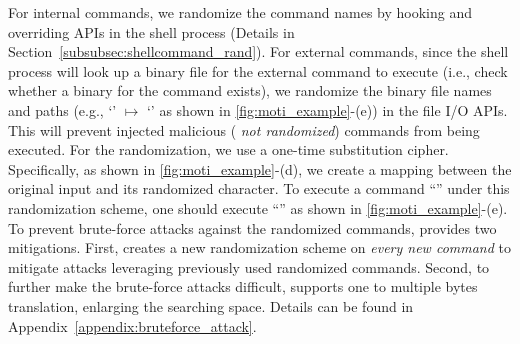 For internal commands, we randomize the command names by hooking and overriding APIs in the shell process (Details in Section~\ref{subsubsec:shellcommand_rand}).
For external commands, since the shell process will look up a binary file for the external command to execute (i.e., check whether a binary for the command exists), we randomize the binary file names and paths (e.g., `' $\mapsto$ `' as shown in \autoref{fig:moti_example}-(e)) in the file I/O APIs. 
This will prevent injected malicious ( {\it not randomized}) commands from being executed. 
%
For the randomization, we use a one-time substitution cipher. %
Specifically, as shown in \autoref{fig:moti_example}-(d), we create a mapping between the original input and its randomized character. %
%
To execute a command ``'' under this randomization scheme, one should execute ``'' as shown in  \autoref{fig:moti_example}-(e). 
To prevent brute-force attacks against the randomized commands, \sysname provides two mitigations. 
First, \sysname creates a new randomization scheme on \emph{every new command} to mitigate attacks leveraging previously used randomized commands.
Second, to further make the brute-force attacks difficult, \sysname supports one to multiple bytes translation, enlarging the searching space.
Details can be found in Appendix~\ref{appendix:bruteforce_attack}.




